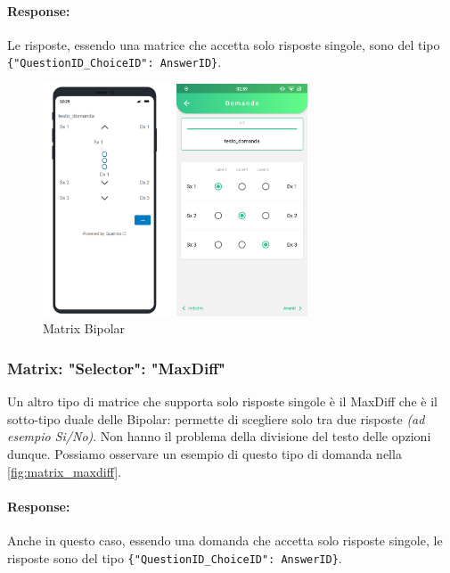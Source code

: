 \paragraph{Response:}
Le risposte, essendo una matrice che accetta solo risposte singole, sono del tipo \texttt{\{"QuestionID\_ChoiceID": AnswerID\}}.

\begin{figure}[h!]
\centering
\includegraphics[width=0.7\textwidth]{img/matrix_bipolar}
\caption{Matrix Bipolar}
\label{fig:matrix_bipolar}
\end{figure}

\clearpage
\subsubsection{Matrix: "Selector": "MaxDiff"}
Un altro tipo di matrice che supporta solo risposte singole è il MaxDiff che è il sotto-tipo duale delle Bipolar: permette di scegliere solo tra due risposte \textit{(ad esempio Si/No)}. Non hanno il problema della divisione del testo delle opzioni dunque. Possiamo osservare un esempio di questo tipo di domanda nella \autoref{fig:matrix_maxdiff}.

\paragraph{Response:}
Anche in questo caso, essendo una domanda che accetta solo risposte singole, le risposte sono del tipo \texttt{\{"QuestionID\_ChoiceID": AnswerID\}}.


